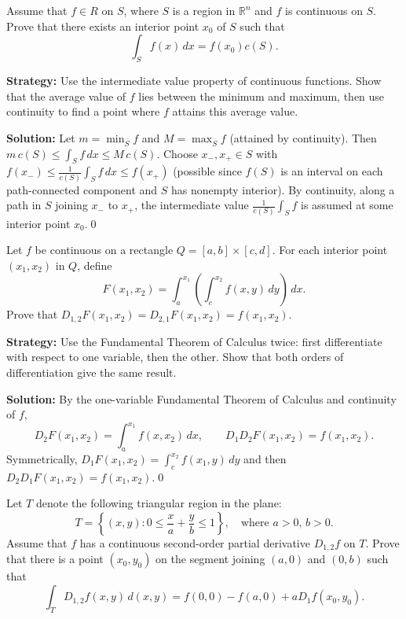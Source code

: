 \begin{problembox}
Assume that \( f \in R \) on \( S \), where \( S \) is a region in \( \mathbb{R}^n \) and \( f \) is continuous on \( S \). Prove that there exists an interior point \( x_0 \) of \( S \) such that
\[\int_S f(x) \, dx = f(x_0)c(S).\]
\end{problembox}

\noindent\textbf{Strategy:} Use the intermediate value property of continuous functions. Show that the average value of $f$ lies between the minimum and maximum, then use continuity to find a point where $f$ attains this average value.

\bigskip\noindent\textbf{Solution:}
Let $m=\min_{\overline S} f$ and $M=\max_{\overline S} f$ (attained by continuity). Then $m\,c(S)\le \int_S f\,dx\le M\,c(S)$. Choose $x_-,x_+\in S$ with $f(x_-)\le \frac{1}{c(S)}\int_S f\,dx\le f(x_+)$ (possible since $f(S)$ is an interval on each path-connected component and $S$ has nonempty interior). By continuity, along a path in $S$ joining $x_-$ to $x_+$, the intermediate value $\frac{1}{c(S)}\int_S f$ is assumed at some interior point $x_0$.\qed


\begin{problembox}
Let \( f \) be continuous on a rectangle \( Q = [a, b] \times [c, d] \). For each interior point \( (x_1, x_2) \) in \( Q \), define
\[F(x_1, x_2) = \int_a^{x_1} \left( \int_c^{x_2} f(x, y) \, dy \right) \, dx.\]
Prove that \( D_{1,2} F(x_1, x_2) = D_{2,1} F(x_1, x_2) = f(x_1, x_2) \).
\end{problembox}

\noindent\textbf{Strategy:} Use the Fundamental Theorem of Calculus twice: first differentiate with respect to one variable, then the other. Show that both orders of differentiation give the same result.

\bigskip\noindent\textbf{Solution:}
By the one-variable Fundamental Theorem of Calculus and continuity of $f$,
\[ D_2 F(x_1,x_2) = \int_a^{x_1} f(x,x_2)\,dx, \qquad D_1 D_2 F(x_1,x_2) = f(x_1,x_2). \]
Symmetrically, $D_1 F(x_1,x_2)=\int_c^{x_2} f(x_1,y)\,dy$ and then $D_2 D_1 F(x_1,x_2)=f(x_1,x_2)$.\qed


\begin{problembox}
Let \( T \) denote the following triangular region in the plane:
\[T = \left\{ (x, y) : 0 \leq \frac{x}{a} + \frac{y}{b} \leq 1 \right\}, \quad \text{where } a > 0, \, b > 0.\]
Assume that \( f \) has a continuous second-order partial derivative \( D_{1,2} f \) on \( T \). Prove that there is a point \( (x_0, y_0) \) on the segment joining \( (a, 0) \) and \( (0, b) \) such that
\[\int_T D_{1,2} f(x, y) \, d(x, y) = f(0, 0) - f(a, 0) + aD_1 f(x_0, y_0).\]
\end{problembox}

